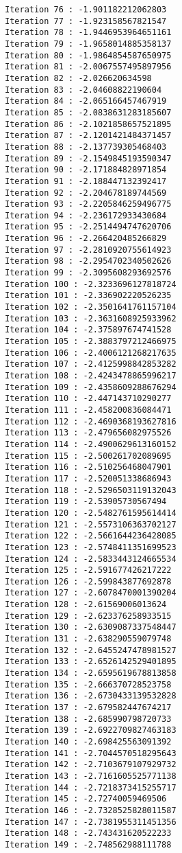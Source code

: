 \documentclass[11pt]{article}
\begin{document}
\begin{Verbatim}[commandchars=\\\{\}]
Iteration 76 : -1.901182212062803
Iteration 77 : -1.923158567821547
Iteration 78 : -1.9446953964651161
Iteration 79 : -1.9658014885358137
Iteration 80 : -1.9864854587650975
Iteration 81 : -2.0067557495897956
Iteration 82 : -2.026620634598
Iteration 83 : -2.04608822190604
Iteration 84 : -2.065166457467919
Iteration 85 : -2.0838631283185607
Iteration 86 : -2.1021858657521895
Iteration 87 : -2.1201421484371457
Iteration 88 : -2.137739305468403
Iteration 89 : -2.1549845193590347
Iteration 90 : -2.171884828971854
Iteration 91 : -2.188447132392417
Iteration 92 : -2.204678189744569
Iteration 93 : -2.2205846259496775
Iteration 94 : -2.236172933430684
Iteration 95 : -2.2514494747620706
Iteration 96 : -2.266420485266829
Iteration 97 : -2.2810920755614923
Iteration 98 : -2.2954702340502626
Iteration 99 : -2.3095608293692576
Iteration 100 : -2.3233696127818724
Iteration 101 : -2.336902220526235
Iteration 102 : -2.3501641761157104
Iteration 103 : -2.3631608925933962
Iteration 104 : -2.375897674741528
Iteration 105 : -2.3883797212466975
Iteration 106 : -2.4006121268217635
Iteration 107 : -2.4125998842853282
Iteration 108 : -2.4243478865996217
Iteration 109 : -2.4358609288676294
Iteration 110 : -2.447143710290277
Iteration 111 : -2.458200836084471
Iteration 112 : -2.4690368193627816
Iteration 113 : -2.479656082975526
Iteration 114 : -2.4900629613160152
Iteration 115 : -2.500261702089695
Iteration 116 : -2.510256468047901
Iteration 117 : -2.520051338686943
Iteration 118 : -2.5296503119132043
Iteration 119 : -2.53905730567494
Iteration 120 : -2.5482761595614414
Iteration 121 : -2.5573106363702127
Iteration 122 : -2.5661644236428085
Iteration 123 : -2.5748411351699523
Iteration 124 : -2.5833443124665534
Iteration 125 : -2.591677426217222
Iteration 126 : -2.599843877692878
Iteration 127 : -2.6078470001390204
Iteration 128 : -2.61569006013624
Iteration 129 : -2.623376258933515
Iteration 130 : -2.6309087337548447
Iteration 131 : -2.638290559079748
Iteration 132 : -2.6455247478981527
Iteration 133 : -2.6526142529401895
Iteration 134 : -2.6595619678813858
Iteration 135 : -2.666370728523758
Iteration 136 : -2.6730433139532828
Iteration 137 : -2.679582447674217
Iteration 138 : -2.685990798720733
Iteration 139 : -2.6922709827463183
Iteration 140 : -2.698425563091392
Iteration 141 : -2.7044570518295643
Iteration 142 : -2.7103679107929732
Iteration 143 : -2.7161605525771138
Iteration 144 : -2.7218373415255717
Iteration 145 : -2.72740059469506
Iteration 146 : -2.7328525828011587
Iteration 147 : -2.7381955311451356
Iteration 148 : -2.743431620522233
Iteration 149 : -2.748562988111788

\end{Verbatim}
\end{document}
